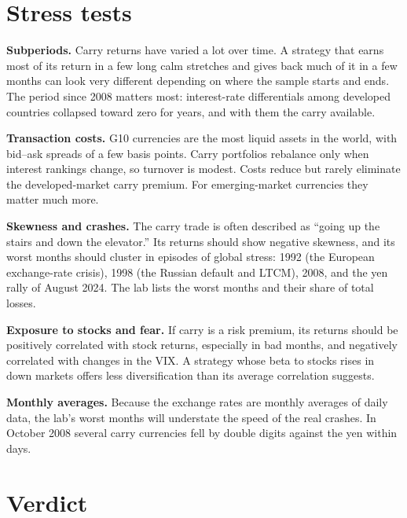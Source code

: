 \section{Stress tests}
\label{sec:11-stress}

\textbf{Subperiods.} Carry returns have varied a lot over time. A strategy that earns most of its return in a few long calm stretches and gives back much of it in a few months can look very different depending on where the sample starts and ends. The period since 2008 matters most: interest-rate differentials among developed countries collapsed toward zero for years, and with them the carry available.

\textbf{Transaction costs.} G10 currencies are the most liquid assets in the world, with bid--ask spreads of a few basis points. Carry portfolios rebalance only when interest rankings change, so turnover is modest. Costs reduce but rarely eliminate the developed-market carry premium. For emerging-market currencies they matter much more.

\textbf{Skewness and crashes.} The carry trade is often described as ``going up the stairs and down the elevator.'' Its returns should show negative skewness, and its worst months should cluster in episodes of global stress: 1992 (the European exchange-rate crisis), 1998 (the Russian default and LTCM), 2008, and the yen rally of August 2024. The lab lists the worst months and their share of total losses.

\textbf{Exposure to stocks and fear.} If carry is a risk premium, its returns should be positively correlated with stock returns, especially in bad months, and negatively correlated with changes in the VIX. A strategy whose beta to stocks rises in down markets offers less diversification than its average correlation suggests.

\textbf{Monthly averages.} Because the exchange rates are monthly averages of daily data, the lab's worst months will understate the speed of the real crashes. In October 2008 several carry currencies fell by double digits against the yen within days.

\section{Verdict}
\label{sec:11-verdict}

